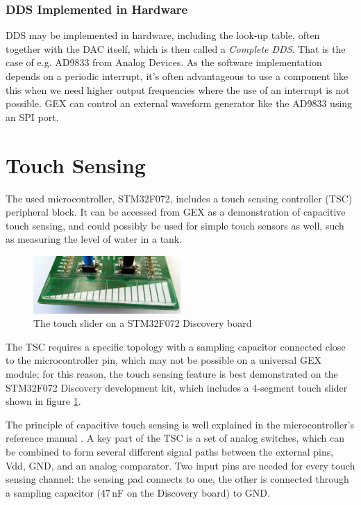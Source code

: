 \subsubsection{DDS Implemented in Hardware}

DDS may be implemented in hardware, including the look-up table, often together with the DAC itself, which is then called a \textit{Complete DDS}. That is the case of e.g. AD9833 from Analog Devices. As the software implementation depends on a periodic interrupt, it's often advantageous to use a component like this when we need higher output frequencies where the use of an interrupt is not possible. GEX can control an external waveform generator like the AD9833 using an SPI port.



\section{Touch Sensing} \label{sec:theory-touch}

The used microcontroller, STM32F072, includes a touch sensing controller (TSC) peripheral block. It can be accessed from GEX as a demonstration of capacitive touch sensing, and could possibly be used for simple touch sensors as well, such as measuring the level of water in a tank.

\begin{figure}[h]
	\centering
	\includegraphics[width=0.5\textwidth] {img/disco-touch.jpg}
	\caption{\label{fig:disco-touch}The touch slider on a STM32F072 Discovery board}
\end{figure}

The TSC requires a specific topology with a sampling capacitor connected close to the microcontroller pin, which may not be possible on a universal GEX module; for this reason, the touch sensing feature is best demonstrated on the STM32F072 Discovery development kit, which includes a 4-segment touch slider shown in figure \ref{fig:disco-touch}.

The principle of capacitive touch sensing is well explained in the microcontroller's reference manual . A key part of the TSC is a set of analog switches, which can be combined to form several different signal paths between the external pins, Vdd, GND, and an analog comparator. Two input pins are needed for every touch sensing channel: the sensing pad connects to one, the other is connected through a sampling capacitor  (47\,nF on the Discovery board) to GND. 

